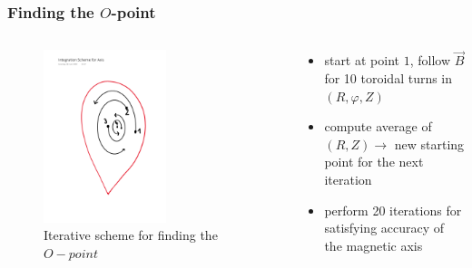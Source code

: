 \documentclass{beamer}
\begin{document}
\begin{frame}
\frametitle{Finding the $O$-point}
\vspace{-1 cm}
\begin{columns}[onlytextwidth]
	\begin{column}{0.5\textwidth}
		\begin{center}
			\begin{figure}
				\includegraphics[trim={6cm 5cm 1.5cm 5cm cm},clip,width=0.6\textwidth]{FIGURES/getOpoint.pdf}
				\caption{Iterative scheme for finding the $O-point$}
			\end{figure}
		\end{center}
	\end{column}
	\begin{column}{0.5\textwidth}
		\vspace{0 cm}
		\begin{center}
			\begin{itemize}
				\item start at point $1$, follow $\vec{B}$ for 10 toroidal turns in $(R,\varphi,Z)$
				\item  compute average of $(R,Z)\rightarrow$ new starting point for the next iteration
				\item perform 20 iterations for satisfying accuracy of the magnetic axis
			\end{itemize}
		\end{center}
	\end{column}
\end{columns}
\end{frame}
\end{document}
